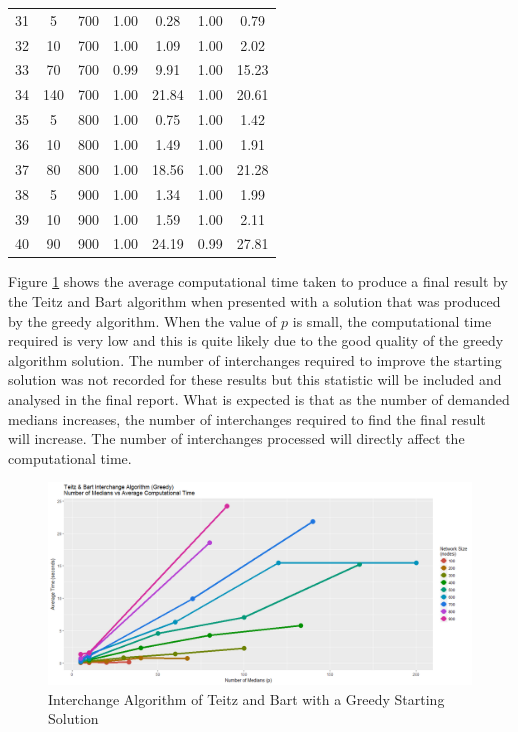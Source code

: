 \documentclass[11pt]{article}
\begin{document}
\begin{table}[]
\begin{tabular}{ccccccc}
			\rowcolor[HTML]{EFEFEF} 
			31 & 5 & 700 & 1.00 & 0.28 & 1.00 & 0.79 \\
			\rowcolor[HTML]{EFEFEF} 
			32 & 10 & 700 & 1.00 & 1.09 & 1.00 & 2.02 \\
			\rowcolor[HTML]{EFEFEF} 
			33 & 70 & 700 & 0.99 & 9.91 & 1.00 & 15.23 \\
			\rowcolor[HTML]{EFEFEF} 
			34 & 140 & 700 & 1.00 & 21.84 & 1.00 & 20.61 \\
			35 & 5 & 800 & 1.00 & 0.75 & 1.00 & 1.42 \\
			36 & 10 & 800 & 1.00 & 1.49 & 1.00 & 1.91 \\
			37 & 80 & 800 & 1.00 & 18.56 & 1.00 & 21.28 \\
			\rowcolor[HTML]{EFEFEF} 
			38 & 5 & 900 & 1.00 & 1.34 & 1.00 & 1.99 \\
			\rowcolor[HTML]{EFEFEF} 
			39 & 10 & 900 & 1.00 & 1.59 & 1.00 & 2.11 \\
			\rowcolor[HTML]{EFEFEF} 
			40 & 90 & 900 & 1.00 & 24.19 & 0.99 & 27.81
		\end{tabular}
	\end{table}	

	Figure \ref{TBGreedy.median.time} shows the average computational time taken to produce a final result by the Teitz and Bart algorithm when presented with a solution that was produced by the greedy algorithm.  When the value of $p$ is small, the computational time required is very low and this is quite likely due to the good quality of the greedy algorithm solution.  The number of interchanges required to improve the starting solution was not recorded for these results but this statistic will be included and analysed in the final report.  What is expected is that as the number of demanded medians increases, the number of interchanges required to find the final result will increase.  The number of interchanges processed will directly affect the computational time.
	
	\begin{figure}[H]
		\begin{center}
			\includegraphics[width=15cm]{TBGreedy.png}
			\caption{Interchange Algorithm of Teitz and Bart with a Greedy Starting Solution}
			\label{TBGreedy.median.time}
		\end{center}
	\end{figure}
\end{document}
